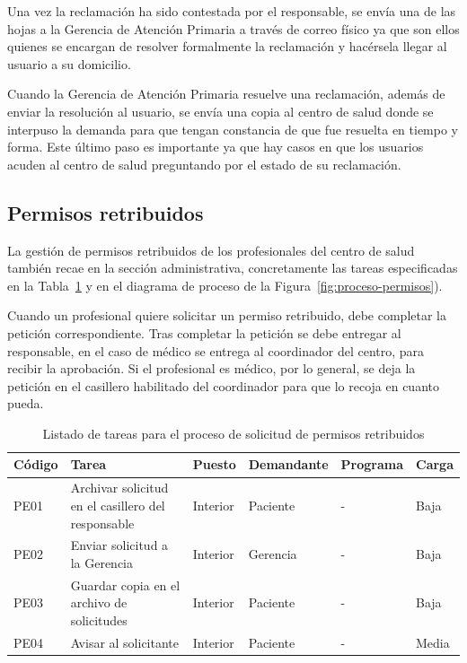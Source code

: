 Una vez la reclamación ha sido contestada por el responsable, se envía una de las hojas a la Gerencia de Atención Primaria a través de correo físico ya que son ellos quienes se encargan de resolver formalmente la reclamación y hacérsela llegar al usuario a su domicilio.

Cuando la Gerencia de Atención Primaria resuelve una reclamación, además de enviar la resolución al usuario, se envía una copia al centro de salud donde se interpuso la demanda para que tengan constancia de que fue resuelta en tiempo y forma.
Este último paso es importante ya que hay casos en que los usuarios acuden al centro de salud preguntando por el estado de su reclamación.

\subsection{Permisos retribuidos}

La gestión de permisos retribuidos de los profesionales del centro de salud también recae en la sección administrativa, concretamente las tareas especificadas en la Tabla~\ref{tab:proceso-permisos} y en el diagrama de proceso de la Figura~\ref{fig:proceso-permisos}).

Cuando un profesional quiere solicitar un permiso retribuido, debe completar la petición correspondiente.
Tras completar la petición se debe entregar al responsable, en el caso de médico se entrega al coordinador del centro, para recibir la aprobación.
Si el profesional es médico, por lo general, se deja la petición en el casillero habilitado del coordinador para que lo recoja en cuanto pueda.

\begin{table}[H]
    \begin{tabular}{lp{5cm}llll}
        \toprule
        Código & Tarea                                              & Puesto   & Demandante & Programa & Carga \\
        \midrule
        PE01   & Archivar solicitud en el casillero del responsable & Interior & Paciente   & -        & Baja  \\
        PE02   & Enviar solicitud a la Gerencia                     & Interior & Gerencia   & -        & Baja  \\
        PE03   & Guardar copia en el archivo de solicitudes         & Interior & Paciente   & -        & Baja  \\
        PE04   & Avisar al solicitante                              & Interior & Paciente   & -        & Media \\
        \bottomrule
    \end{tabular}
    \caption{Listado de tareas para el proceso de solicitud de permisos retribuidos}
    \label{tab:proceso-permisos}
\end{table}

